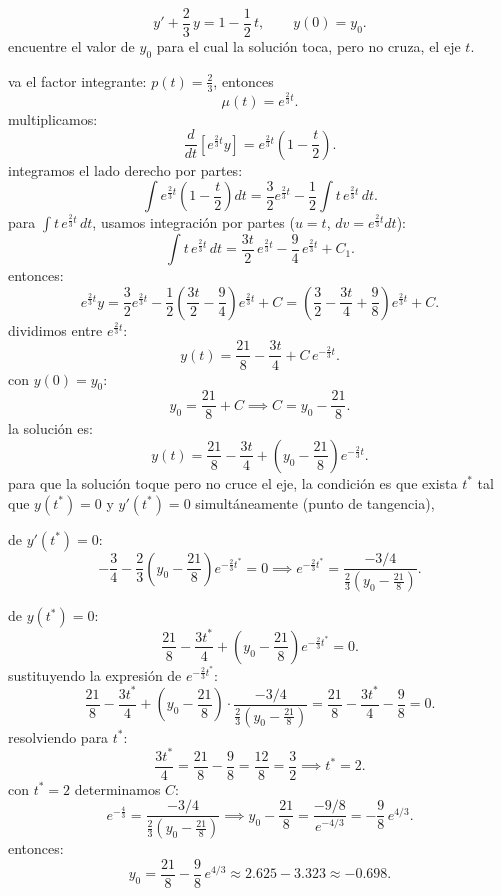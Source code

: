 \begin{respuesta}
\[
  y' + \frac{2}{3}\,y = 1 - \frac{1}{2}\,t, \qquad y(0) = y_0.
\]
encuentre el valor de $y_0$ para el cual la soluci\'on toca, pero no cruza,
el eje $t$.

va el factor integrante: $p(t) = \tfrac{2}{3}$, entonces
\[
  \mu(t) = e^{\frac{2}{3}t}.
\]
multiplicamos:
\[
  \frac{d}{dt}\!\left[e^{\frac{2}{3}t}y\right] = e^{\frac{2}{3}t}\!\left(1 - \frac{t}{2}\right).
\]
integramos el lado derecho por partes:
\[
  \int e^{\frac{2}{3}t}\!\left(1-\frac{t}{2}\right)dt
  = \frac{3}{2}e^{\frac{2}{3}t} - \frac{1}{2}\int t\,e^{\frac{2}{3}t}\,dt.
\]
para $\displaystyle\int t\,e^{\frac{2}{3}t}\,dt$, usamos integraci\'on por partes
($u=t$, $dv = e^{\frac{2}{3}t}dt$):
\[
  \int t\,e^{\frac{2}{3}t}\,dt = \frac{3t}{2}\,e^{\frac{2}{3}t} - \frac{9}{4}\,e^{\frac{2}{3}t} + C_1.
\]
entonces:
\[
  e^{\frac{2}{3}t}y = \frac{3}{2}e^{\frac{2}{3}t} - \frac{1}{2}\!\left(\frac{3t}{2} - \frac{9}{4}\right)e^{\frac{2}{3}t} + C
  = \left(\frac{3}{2} - \frac{3t}{4} + \frac{9}{8}\right)e^{\frac{2}{3}t} + C.
\]
dividimos entre $e^{\frac{2}{3}t}$:
\[
  y(t) = \frac{21}{8} - \frac{3t}{4} + C\,e^{-\frac{2}{3}t}.
\]
con $y(0) = y_0$:
\[
  y_0 = \frac{21}{8} + C \implies C = y_0 - \frac{21}{8}.
\]
la soluci\'on es:
\[
  y(t) = \frac{21}{8} - \frac{3t}{4} + \left(y_0 - \frac{21}{8}\right)e^{-\frac{2}{3}t}.
\]
para que la soluci\'on toque pero no cruce el eje, la condici\'on es que
exista $t^*$ tal que $y(t^*)=0$ y $y'(t^*)=0$ simult\'aneamente (punto de tangencia),

de $y'(t^*) = 0$:
\[
  -\frac{3}{4} - \frac{2}{3}\left(y_0 - \frac{21}{8}\right)e^{-\frac{2}{3}t^*} = 0
  \implies
  e^{-\frac{2}{3}t^*} = \frac{-3/4}{\frac{2}{3}(y_0 - \frac{21}{8})}.
\]

de $y(t^*)=0$:
\[
  \frac{21}{8} - \frac{3t^*}{4} + \left(y_0 - \frac{21}{8}\right)e^{-\frac{2}{3}t^*} = 0.
\]
sustituyendo la expresi\'on de $e^{-\frac{2}{3}t^*}$:
\[
  \frac{21}{8} - \frac{3t^*}{4} + \left(y_0 - \frac{21}{8}\right)\cdot\frac{-3/4}{\frac{2}{3}(y_0-\frac{21}{8})}
  = \frac{21}{8} - \frac{3t^*}{4} - \frac{9}{8} = 0.
\]
resolviendo para $t^*$:
\[
  \frac{3t^*}{4} = \frac{21}{8} - \frac{9}{8} = \frac{12}{8} = \frac{3}{2}
  \implies t^* = 2.
\]
con $t^* = 2$ determinamos $C$:
\[
  e^{-\frac{4}{3}} = \frac{-3/4}{\frac{2}{3}(y_0-\frac{21}{8})}
  \implies y_0 - \frac{21}{8} = \frac{-9/8}{e^{-4/3}} = -\frac{9}{8}\,e^{4/3}.
\]
entonces:
\[
  \boxed{y_0 = \frac{21}{8} - \frac{9}{8}\,e^{4/3} \approx 2.625 - 3.323 \approx -0.698.}
\]
    \vspace{7cm}
\end{respuesta}

